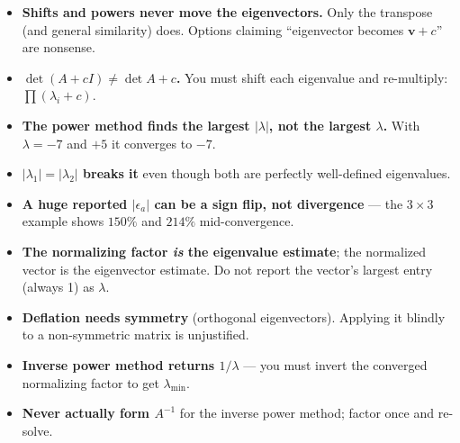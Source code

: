 \begin{trapbox}
\begin{itemize}
\item \textbf{Shifts and powers never move the eigenvectors.} Only the transpose (and general similarity) does. Options claiming ``eigenvector becomes $\mathbf v + c$'' are nonsense.
\item \textbf{$\det(A+cI) \ne \det A + c$.} You must shift each eigenvalue and re-multiply: $\prod(\lambda_i + c)$.
\item \textbf{The power method finds the largest $|\lambda|$, not the largest $\lambda$.} With $\lambda = -7$ and $+5$ it converges to $-7$.
\item \textbf{$|\lambda_1| = |\lambda_2|$ breaks it} even though both are perfectly well-defined eigenvalues.
\item \textbf{A huge reported $|\epsilon_a|$ can be a sign flip, not divergence} --- the $3\times3$ example shows $150\%$ and $214\%$ mid-convergence.
\item \textbf{The normalizing factor \emph{is} the eigenvalue estimate}; the normalized vector is the eigenvector estimate. Do not report the vector's largest entry (always 1) as $\lambda$.
\item \textbf{Deflation needs symmetry} (orthogonal eigenvectors). Applying it blindly to a non-symmetric matrix is unjustified.
\item \textbf{Inverse power method returns $1/\lambda$} --- you must invert the converged normalizing factor to get $\lambda_{\min}$.
\item \textbf{Never actually form $A^{-1}$} for the inverse power method; factor once and re-solve.
\end{itemize}
\end{trapbox}
